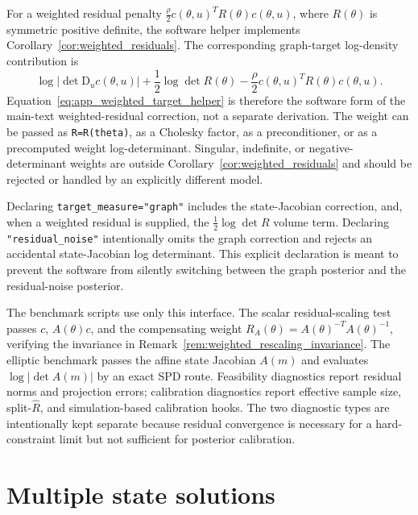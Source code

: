 \documentclass[11pt]{article}
\newcommand{\D}{\mathrm{D}}
\newcommand{\abs}[1]{\left\lvert #1\right\rvert}
\begin{document}
For a weighted residual penalty \(\frac{\rho}{2}c(\theta,u)^T R(\theta)c(\theta,u)\), where \(R(\theta)\) is symmetric positive definite, the software helper implements Corollary~\ref{cor:weighted_residuals}. The corresponding graph-target log-density contribution is
\begin{equation}
 \log\abs{\det \D_u c(\theta,u)}
 + \frac{1}{2}\log\det R(\theta)
 - \frac{\rho}{2} c(\theta,u)^T R(\theta)c(\theta,u).
 \label{eq:app_weighted_target_helper}
\end{equation}
Equation~\eqref{eq:app_weighted_target_helper} is therefore the software form of the main-text weighted-residual correction, not a separate derivation. The weight can be passed as \texttt{R=R(theta)}, as a Cholesky factor, as a preconditioner, or as a precomputed weight log-determinant. Singular, indefinite, or negative-determinant weights are outside Corollary~\ref{cor:weighted_residuals} and should be rejected or handled by an explicitly different model. 

Declaring \texttt{target\_measure="graph"} includes the state-Jacobian correction, and, when a weighted residual is supplied, the \(\frac12\log\det R\) volume term. Declaring \texttt{"residual\_noise"} intentionally omits the graph correction and rejects an accidental state-Jacobian log determinant. This explicit declaration is meant to prevent the software from silently switching between the graph posterior and the residual-noise posterior.

The benchmark scripts use only this interface. The scalar residual-scaling test passes \(c\), \(A(\theta)c\), and the compensating weight \(R_A(\theta)=A(\theta)^{-T}A(\theta)^{-1}\), verifying the invariance in Remark~\ref{rem:weighted_rescaling_invariance}. The elliptic benchmark passes the affine state Jacobian \(A(m)\) and evaluates \(\log\abs{\det A(m)}\) by an exact SPD route. Feasibility diagnostics report residual norms and projection errors; calibration diagnostics report effective sample size, split-\(\hat R\), and simulation-based calibration hooks. The two diagnostic types are intentionally kept separate because residual convergence is necessary for a hard-constraint limit but not sufficient for posterior calibration.


\section{Multiple state solutions}
\label{app:multiple_roots}
\end{document}
